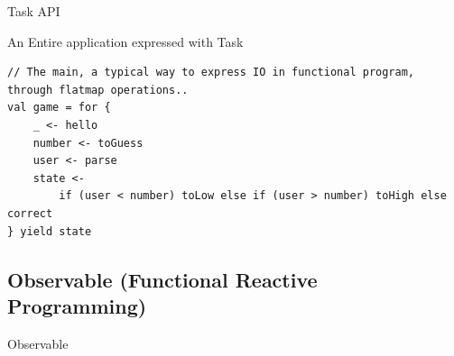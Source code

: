 \documentclass[presentation, 9pt]{beamer}\mode<presentation>{\usetheme{AMSBolognaFC}}
\begin{document}
\begin{frame}{Task API}
\begin{alertblock}{An Entire application expressed with Task}
\begin{tcolorbox}[left=0pt, top=0pt, bottom=0pt]
\begin{verbatim}
// The main, a typical way to express IO in functional program, through flatmap operations..
val game = for {
	_ <- hello
	number <- toGuess
	user <- parse
	state <-
		if (user < number) toLow else if (user > number) toHigh else correct
} yield state
					\end{verbatim}
				\end{tcolorbox}
		\end{alertblock}
\end{frame}
\subsection{Observable (Functional Reactive Programming)}
\begin{frame}{Observable \href{https://monix.io/docs/current/reactive/observable.html}{\faLink}}


\end{frame}
\end{document}
